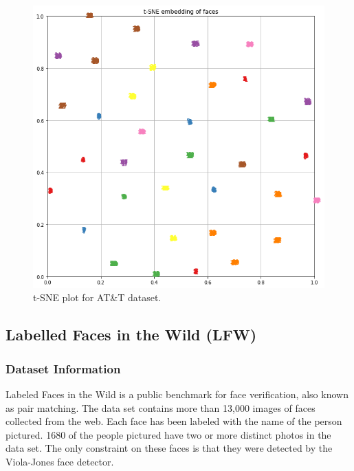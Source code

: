 \documentclass[
12pt,
tightenlines,
aps,
prb,
twocolumn,
superscriptaddress,
longbibliography,
floatfix
]{revtex4-2}
\begin{document}
\begin{center}
\begin{figure}[t!]
\begin{minipage}[b]{0.45\linewidth}
    \includegraphics[clip=true,width=\textwidth]{tSNE_embds_ATT_train.png}
    \caption{t-SNE plot for AT\&T dataset.}
    \label{fig:tsne_att}
    \end{minipage}
\end{figure}
\end{center}
\twocolumngrid

\subsection{Labelled Faces in the Wild (LFW)}
\subsubsection{Dataset Information} 

Labeled Faces in the Wild is a public benchmark for face verification, also known as pair matching. The data set contains more than 13,000 images of faces collected from the web. Each face has been labeled with the name of the person pictured. 1680 of the people pictured have two or more distinct photos in the data set. The only constraint on these faces is that they were detected by the Viola-Jones face detector. 
\end{document}
